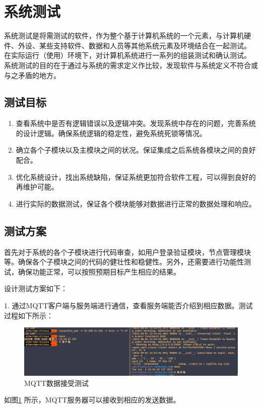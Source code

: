 \section{系统测试}

系统测试是将需测试的软件，作为整个基于计算机系统的一个元素，与计算机硬件、外设、某些支持软件、数据和人员等其他系统元素及环境结合在一起测试。 在实际运行（使用）环境下，对计算机系统进行一系列的组装测试和确认测试。 系统测试的目的在于通过与系统的需求定义作比较，发现软件与系统定义不符合或与之矛盾的地方。

\subsection{测试目标}

\begin{enumerate}
	\item 查看系统中是否有逻辑错误以及逻辑冲突。发现系统中存在的问题，完善系统的设计逻辑。确保系统逻辑的稳定性，避免系统死锁等情况。
	\item 确立各个子模块以及主模块之间的状况。保证集成之后系统各模块之间的良好配合。
	\item 优化系统设计，找出系统缺陷，保证系统更加符合软件工程，可以得到良好的再维护可能。
	\item 进行实际的数据测试，保证各个模块能够对数据进行正常的数据处理和响应。
\end{enumerate}

\subsection{测试方案}

首先对于系统的各个子模块进行代码审查，如用户登录验证模块，节点管理模块等。确保各个子模块之间的代码的健壮性和稳健性。另外，还需要进行功能性测试，确保功能正常，可以按照预期目标产生相应的结果。

设计测试方案如下：
 
1. 通过MQTT客户端与服务端进行通信，查看服务端能否介绍到相应数据。测试过程如下所示：
\begin{figure}[htbp]
	\centering
	\includegraphics[width=0.85\linewidth]{figure/test-1}
	\caption{MQTT数据接受测试}
	\label{fig:6-1}
\end{figure}
如图\ref*{fig:6-1} 所示，MQTT服务器可以接收到相应的发送数据。

